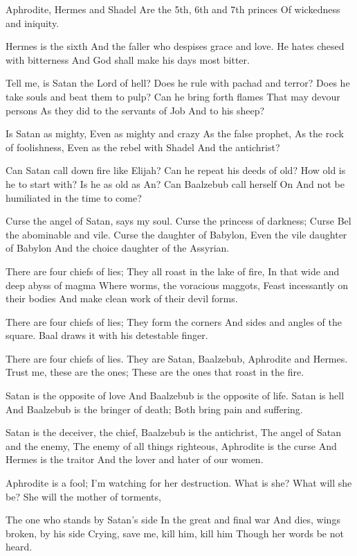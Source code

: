 \documentclass[
]{book}
\begin{document}
Aphrodite, Hermes and Shadel
Are the 5th, 6th and 7th princes
Of wickedness and iniquity.

Hermes is the sixth
And the faller who despises grace and love.
He hates chesed with bitterness
And God shall make his days most bitter.

Tell me, is Satan the Lord of hell?
Does he rule with pachad and terror?
Does he take souls and beat them to pulp?
Can he bring forth flames
That may devour persons
As they did to the servants of Job
And to his sheep?

Is Satan as mighty,
Even as mighty and crazy
As the false prophet,
As the rock of foolishness,
Even as the rebel with Shadel
And the antichrist?

Can Satan call down fire like Elijah?
Can he repeat his deeds of old?
How old is he to start with?
Is he as old as An?
Can Baalzebub call herself On
And not be humiliated in the time to come?

Curse the angel of Satan, says my soul.
Curse the princess of darkness;
Curse Bel the abominable and vile.
Curse the daughter of Babylon,
Even the vile daughter of Babylon
And the choice daughter of the Assyrian.

There are four chiefs of lies;
They all roast in the lake of fire,
In that wide and deep abyss of magma
Where worms, the voracious maggots,
Feast incessantly on their bodies
And make clean work of their devil forms.

There are four chiefs of lies;
They form the corners
And sides and angles of the square.
Baal draws it with his detestable finger.

There are four chiefs of lies.
They are Satan, Baalzebub,
Aphrodite and Hermes.
Trust me, these are the ones;
These are the ones that roast in the fire.

Satan is the opposite of love
And Baalzebub is the opposite of life.
Satan is hell
And Baalzebub is the bringer of death;
Both bring pain and suffering.

Satan is the deceiver, the chief,
Baalzebub is the antichrist,
The angel of Satan and the enemy,
The enemy of all things righteous,
Aphrodite is the curse
And Hermes is the traitor
And the lover and hater of our women.

Aphrodite is a fool;
I'm watching for her destruction.
What is she? What will she be?
She will the mother of torments,

The one who stands by Satan's side
In the great and final war
And dies, wings broken, by his side
Crying, save me, kill him, kill him
Though her words be not heard.
\end{document}
